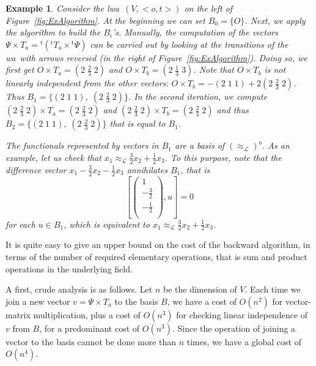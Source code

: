 \documentclass[3p]{elsarticle}
\newcommand{\fL}{\mathcal{L}}    %
\newcommand{\transp}{{}^{\mathrm{t}}}  %
\newcommand{\ann}{o}                    %
\newcommand{\wa}{{\sc wa}}             %
\newcommand{\lwa}{{\sc lwa}}           %
\newtheorem{example}{Example}
\begin{document}
\begin{example}\label{Ex:Bisim}
Consider the \lwa\ $(V,<o,t>)$ on the left of Figure~\ref{fig:ExAlgorithm}. At the beginning we can set $B_0=\{O\}$.
Next, we apply the algorithm to build the  $B_i$'s. Manually, the
computation of the vectors $\Psi \times  T_a =\transp(\transp T_a \times  \transp
\Psi)$ can be carried out by looking at the transitions of the \wa\
with arrows reversed (in the right of Figure~\ref{fig:ExAlgorithm}).
%
Doing so, we first get  $O\times  T_a=(2\;\frac{2}{3}\;2)$ and $O
\times  T_b=(2\;\frac{1}{3}\;3)$. Note that $O\times  T_b$ is not linearly independent
 from the other vectors: $O\times  T_b=-(2\;1\;1)+2(2\;\frac{2}{3}\;2)$. Thus $B_1=\{(2\;1\;1),
 \; (2\;\frac{2}{3}\;2)\}$. In the second iteration, we compute $(2\;\frac{2}{3}\;2)
\times  T_a=(2\;\frac{2}{3}\;2)$ and $(2\;\frac{2}{3}\;2) \times
 T_b=(2\;\frac{2}{3}\;2)$ and thus $B_2=\{(2\;1\;1),
 \;(2\;\frac{2}{3}\;2)\}$ that is equal to $B_1$.

The functionals represented by vectors in $B_1$ are  a basis of
$(\approx_\fL)^\ann$. As an example, let us check that $x_1
\approx_\fL \frac{3}{2}x_2 + \frac{1}{2}x_3$. To this purpose, note
that the difference vector $x_1 - \frac{3}{2}x_2 - \frac{1}{2}x_3$
annihilates $B_1$, that is $$[\left(%
\begin{array}{c}
  1 \\
  -\frac{3}{2}\\
  -\frac{1}{2}\\
\end{array}\right),u]=0$$ for each $u\in B_1$,
 which is equivalent to $x_1
\approx_\fL \frac{3}{2}x_2+\frac{1}{2}x_3$.
\end{example}

It is quite easy to give an upper bound on the cost of the backward algorithm, in terms of the number of required elementary operations, that is sum and product operations in the underlying field. %

A first, crude   analysis is as follows. Let $n$ be the dimension of $V$. Each time we join a new vector $v=\Psi\times T_a$   to the basis $B$, we have a cost of $O(n^2)$ for vector-matrix multiplication, plus a cost of $O(n^3)$ for checking linear independence of $v$ from $B$, for a predominant cost of $O(n^3)$. Since the operation of joining a vector to the basis cannot be done more than $n$ times, we have a global cost of $O(n^4)$.
\end{document}

